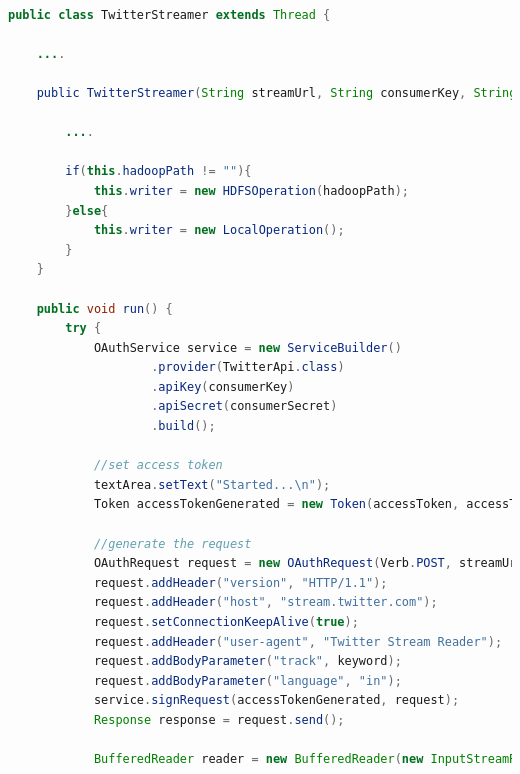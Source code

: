 \begin{lstlisting}[language=Java,basicstyle=\tiny,caption=TwitterStreamer.java,label={lst:kode_twitter_streamer}]

public class TwitterStreamer extends Thread {

    ....
    
    public TwitterStreamer(String streamUrl, String consumerKey, String consumerSecret, String accessToken, String accessTokenSecret, String keyword, String hadoopPath, String filePath, JTextArea textArea, JLabel lastStreamLabel) {
        
        ....
        
        if(this.hadoopPath != ""){
            this.writer = new HDFSOperation(hadoopPath);
        }else{
            this.writer = new LocalOperation();
        }
    }

    public void run() {
        try {
            OAuthService service = new ServiceBuilder()
                    .provider(TwitterApi.class)
                    .apiKey(consumerKey)
                    .apiSecret(consumerSecret)
                    .build();

            //set access token
            textArea.setText("Started...\n");
            Token accessTokenGenerated = new Token(accessToken, accessTokenSecret);

            //generate the request
            OAuthRequest request = new OAuthRequest(Verb.POST, streamUrl);
            request.addHeader("version", "HTTP/1.1");
            request.addHeader("host", "stream.twitter.com");
            request.setConnectionKeepAlive(true);
            request.addHeader("user-agent", "Twitter Stream Reader");
            request.addBodyParameter("track", keyword); 
            request.addBodyParameter("language", "in");
            service.signRequest(accessTokenGenerated, request);
            Response response = request.send();
            
            BufferedReader reader = new BufferedReader(new InputStreamReader(response.getStream()));
            

\end{lstlisting}
